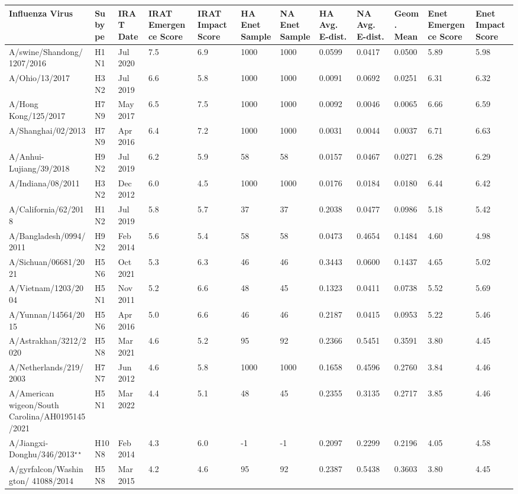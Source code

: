 \begin{tabular}{L{1.32in}|L{.35in}|L{.3in}|L{.3in}|L{.3in}|L{.35in}|L{.35in}|L{.35in}|L{.35in}|L{.32in}|L{.3in}|L{.3in}}\hline
Influenza Virus & Subype & IRAT Date &IRAT Emergence Score &IRAT Impact Score &HA Enet Sample &NA Enet Sample &HA Avg. E-dist. &NA Avg. E-dist. &Geom. Mean&Enet Emergence Score&Enet Impact Score \\\hline
 A/swine/Shandong/1207/2016 &H1N1& Jul  2020 &7.5&6.9&1000&1000&0.0599&0.0417&0.0500&5.89&5.98\\\hline
 A/Ohio/13/2017 &H3N2& Jul  2019 &6.6&5.8&1000&1000&0.0091&0.0692&0.0251&6.31&6.32\\\hline
 A/Hong  Kong/125/2017 &H7N9& May  2017 &6.5&7.5&1000&1000&0.0092&0.0046&0.0065&6.66&6.59\\\hline
 A/Shanghai/02/2013 &H7N9& Apr  2016 &6.4&7.2&1000&1000&0.0031&0.0044&0.0037&6.71&6.63\\\hline
 A/Anhui-Lujiang/39/2018 &H9N2& Jul  2019 &6.2&5.9&58&58&0.0157&0.0467&0.0271&6.28&6.29\\\hline
 A/Indiana/08/2011 &H3N2& Dec  2012 &6.0&4.5&1000&1000&0.0176&0.0184&0.0180&6.44&6.42\\\hline
 A/California/62/2018 &H1N2& Jul  2019 &5.8&5.7&37&37&0.2038&0.0477&0.0986&5.18&5.42\\\hline
 A/Bangladesh/0994/2011 &H9N2& Feb  2014 &5.6&5.4&58&58&0.0473&0.4654&0.1484&4.60&4.98\\\hline
 A/Sichuan/06681/2021 &H5N6& Oct  2021 &5.3&6.3&46&46&0.3443&0.0600&0.1437&4.65&5.02\\\hline
 A/Vietnam/1203/2004 &H5N1& Nov  2011 &5.2&6.6&48&45&0.1323&0.0411&0.0738&5.52&5.69\\\hline
 A/Yunnan/14564/2015 &H5N6& Apr  2016 &5.0&6.6&46&46&0.2187&0.0415&0.0953&5.22&5.46\\\hline
 A/Astrakhan/3212/2020 &H5N8& Mar  2021 &4.6&5.2&95&92&0.2366&0.5451&0.3591&3.80&4.45\\\hline
 A/Netherlands/219/2003 &H7N7& Jun  2012 &4.6&5.8&1000&1000&0.1658&0.4596&0.2760&3.84&4.46\\\hline
 A/American  wigeon/South  Carolina/AH0195145/2021 &H5N1& Mar  2022 &4.4&5.1&48&45&0.2355&0.3135&0.2717&3.85&4.46\\\hline
 A/Jiangxi-Donghu/346/2013$^{\star\star}$ &H10N8& Feb  2014 &4.3&6.0&-1&-1&0.2097&0.2299&0.2196&4.05&4.58\\\hline
 A/gyrfalcon/Washington/ 41088/2014 &H5N8& Mar  2015 &4.2&4.6&95&92&0.2387&0.5438&0.3603&3.80&4.45\\\hline

\end{tabular}
